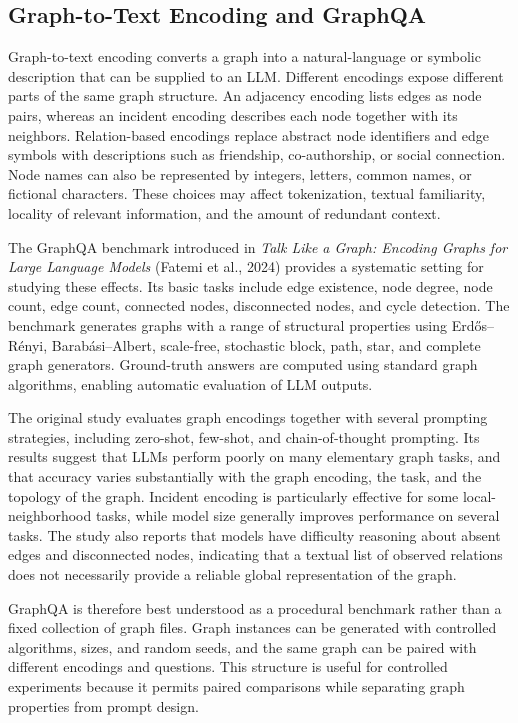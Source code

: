 \documentclass[11pt,a4paper]{article}
\begin{document}
\subsection{Graph-to-Text Encoding and GraphQA}

Graph-to-text encoding converts a graph into a natural-language or symbolic description that can be supplied to an LLM. Different encodings expose different parts of the same graph structure. An adjacency encoding lists edges as node pairs, whereas an incident encoding describes each node together with its neighbors. Relation-based encodings replace abstract node identifiers and edge symbols with descriptions such as friendship, co-authorship, or social connection. Node names can also be represented by integers, letters, common names, or fictional characters. These choices may affect tokenization, textual familiarity, locality of relevant information, and the amount of redundant context.

The GraphQA benchmark introduced in \emph{Talk Like a Graph: Encoding Graphs for Large Language Models} (Fatemi et al., 2024) provides a systematic setting for studying these effects. Its basic tasks include edge existence, node degree, node count, edge count, connected nodes, disconnected nodes, and cycle detection. The benchmark generates graphs with a range of structural properties using Erdős–Rényi, Barabási–Albert, scale-free, stochastic block, path, star, and complete graph generators. Ground-truth answers are computed using standard graph algorithms, enabling automatic evaluation of LLM outputs.

The original study evaluates graph encodings together with several prompting strategies, including zero-shot, few-shot, and chain-of-thought prompting. Its results suggest that LLMs perform poorly on many elementary graph tasks, and that accuracy varies substantially with the graph encoding, the task, and the topology of the graph. Incident encoding is particularly effective for some local-neighborhood tasks, while model size generally improves performance on several tasks. The study also reports that models have difficulty reasoning about absent edges and disconnected nodes, indicating that a textual list of observed relations does not necessarily provide a reliable global representation of the graph.

GraphQA is therefore best understood as a procedural benchmark rather than a fixed collection of graph files. Graph instances can be generated with controlled algorithms, sizes, and random seeds, and the same graph can be paired with different encodings and questions. This structure is useful for controlled experiments because it permits paired comparisons while separating graph properties from prompt design.
\end{document}
